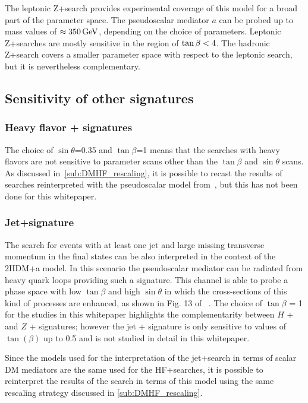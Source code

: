 The leptonic Z+\MET search provides experimental coverage of this model for a broad part of the parameter space. The pseudoscalar mediator $a$ can be probed up to mass values of $\approx\unit[350]{GeV}$, depending on the choice of parameters. Leptonic Z+\MET searches are mostly sensitive in the region of $\tan\beta<4$. The hadronic Z+\MET search covers a smaller parameter space with respect to the leptonic search, but it is nevertheless complementary.

\FloatBarrier

\subsection{Sensitivity of other signatures}

\subsubsection{Heavy flavor + \MET signatures}

The choice of $\sin\theta$=0.35 and $\tan\beta$=1 means that the searches with heavy flavors are not sensitive to parameter scans other than the $\tan\beta$ and $\sin\theta$ scans. As discussed in~\autoref{sub:DMHF_rescaling}, it is possible to recast the results of searches reinterpreted with the pseudoscalar model from~\cite{Abercrombie:2015wmb}, but this has not been done for this whitepaper. 

\subsubsection{Jet+\MET signature}

The search for events with at least one jet and large missing transverse momentum in the final states can be also interpreted in the context of the 2HDM+a model. In this scenario the pseudoscalar mediator can be radiated from heavy quark loops providing such a signature. This channel is able to probe a phase space with low $\tan\beta$ and high $\sin\theta$ in which the cross-sections of this kind of processes are enhanced, as shown in Fig. 13 of ~\cite{Bauer:2017ota}. The choice of $\tan\beta$ = 1 for the studies in this whitepaper highlights the complementarity between $H$ + \MET and $Z$ + \MET signatures; however the jet + \MET signature is only sensitive to values of $\tan(\beta)$ up to 0.5 and is not studied in detail in this whitepaper. 

Since the models used for the interpretation of the jet+\MET search in terms of scalar DM mediators are the same used for the HF+\MET searches, it is possible to reinterpret the results of the search in terms of this model using the same rescaling strategy discussed in \autoref{sub:DMHF_rescaling}. 

%



\FloatBarrier